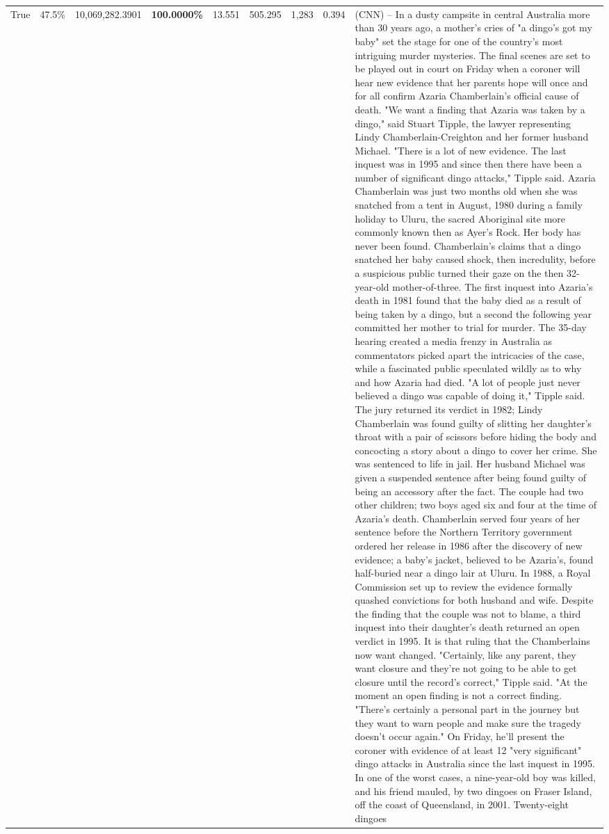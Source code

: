 \begin{table}[H]
\begin{tabular}{lllrlllll}
True & 47.5\% & 10,069,282.3901 & \bfseries \color{red} 100.0000\% & 13.551 & 505.295 & 1,283 & 0.394 & (CNN) -- In a dusty campsite in central Australia more than 30 years ago, a mother's cries of "a dingo's got my baby" set the stage for one of the country's most intriguing murder mysteries. The final scenes are set to be played out in court on Friday when a coroner will hear new evidence that her parents hope will once and for all confirm Azaria Chamberlain's official cause of death. "We want a finding that Azaria was taken by a dingo," said Stuart Tipple, the lawyer representing Lindy Chamberlain-Creighton and her former husband Michael. "There is a lot of new evidence. The last inquest was in 1995 and since then there have been a number of significant dingo attacks," Tipple said. Azaria Chamberlain was just two months old when she was snatched from a tent in August, 1980 during a family holiday to Uluru, the sacred Aboriginal site more commonly known then as Ayer's Rock. Her body has never been found. Chamberlain's claims that a dingo snatched her baby caused shock, then incredulity, before a suspicious public turned their gaze on the then 32-year-old mother-of-three. The first inquest into Azaria's death in 1981 found that the baby died as a result of being taken by a dingo, but a second the following year committed her mother to trial for murder. The 35-day hearing created a media frenzy in Australia as commentators picked apart the intricacies of the case, while a fascinated public speculated wildly as to why and how Azaria had died. "A lot of people just never believed a dingo was capable of doing it," Tipple said. The jury returned its verdict in 1982; Lindy Chamberlain was found guilty of slitting her daughter's throat with a pair of scissors before hiding the body and concocting a story about a dingo to cover her crime. She was sentenced to life in jail. Her husband Michael was given a suspended sentence after being found guilty of being an accessory after the fact. The couple had two other children; two boys aged six and four at the time of Azaria's death. Chamberlain served four years of her sentence before the Northern Territory government ordered her release in 1986 after the discovery of new evidence; a baby's jacket, believed to be Azaria's, found half-buried near a dingo lair at Uluru. In 1988, a Royal Commission set up to review the evidence formally quashed convictions for both husband and wife. Despite the finding that the couple was not to blame, a third inquest into their daughter's death returned an open verdict in 1995. It is that ruling that the Chamberlains now want changed. "Certainly, like any parent, they want closure and they're not going to be able to get closure until the record's correct," Tipple said. "At the moment an open finding is not a correct finding. "There's certainly a personal part in the journey but they want to warn people and make sure the tragedy doesn't occur again." On Friday, he'll present the coroner with evidence of at least 12 "very significant" dingo attacks in Australia since the last inquest in 1995. In one of the worst cases, a nine-year-old boy was killed, and his friend mauled, by two dingoes on Fraser Island, off the coast of Queensland, in 2001. Twenty-eight dingoes 
\end{tabular}
\end{table}
